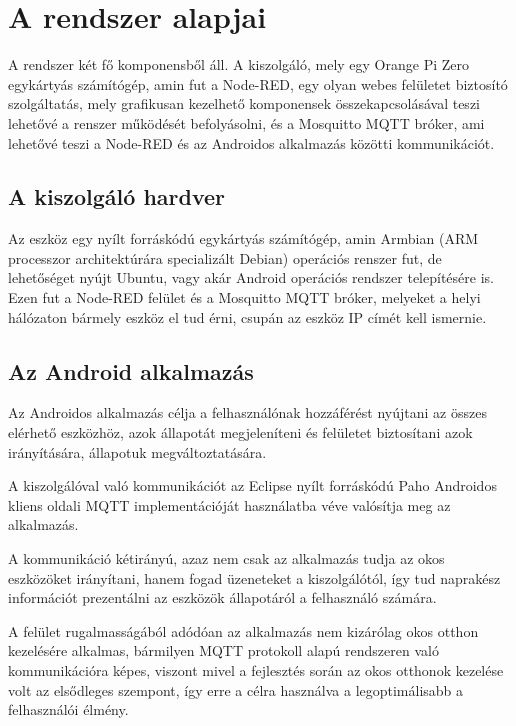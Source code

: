 \documentclass[
]{thesis-ekf}
\theoremstyle{definition}
\theoremstyle{remark}
\begin{document}
\chapter{A rendszer alapjai}
A rendszer két fő komponensből áll. A kiszolgáló, mely egy Orange Pi Zero egykártyás számítógép, 
amin fut a Node-RED\cite{nodeRed}, egy olyan webes felületet biztosító szolgáltatás, 
mely grafikusan kezelhető komponensek összekapcsolásával teszi lehetővé a renszer működését befolyásolni, 
és a Mosquitto MQTT bróker\cite{mosquitto}, ami lehetővé teszi a Node-RED és az Androidos alkalmazás  
közötti kommunikációt.

\section{A kiszolgáló hardver}
Az eszköz egy nyílt forráskódú egykártyás számítógép, amin Armbian\cite{armbian} (ARM processzor architektúrára specializált Debian) 
operációs renszer fut, de lehetőséget nyújt Ubuntu, vagy akár Android operációs rendszer telepítésére is. 
Ezen fut a Node-RED felület és a Mosquitto MQTT bróker, melyeket a helyi hálózaton bármely eszköz el tud érni, 
csupán az eszköz IP címét kell ismernie.

\section{Az Android alkalmazás}
Az Androidos alkalmazás célja a felhasználónak hozzáférést nyújtani az összes elérhető eszközhöz, 
azok állapotát megjeleníteni és felületet biztosítani azok irányítására, állapotuk megváltoztatására. 

A kiszolgálóval való kommunikációt az Eclipse nyílt forráskódú Paho\cite{paho} 
Androidos kliens oldali MQTT implementációját használatba véve valósítja meg az alkalmazás. 

A kommunikáció kétirányú, azaz nem csak az alkalmazás tudja az okos eszközöket irányítani, 
hanem fogad üzeneteket a kiszolgálótól, így tud naprakész információt prezentálni az eszközök állapotáról a felhasználó számára.

A felület rugalmasságából adódóan az alkalmazás  nem kizárólag okos otthon kezelésére alkalmas, bármilyen MQTT protokoll alapú rendszeren 
való kommunikációra képes, viszont mivel a fejlesztés során az okos otthonok kezelése volt az elsődleges szempont, 
így erre a célra használva a legoptimálisabb a felhasználói élmény.
\end{document}

